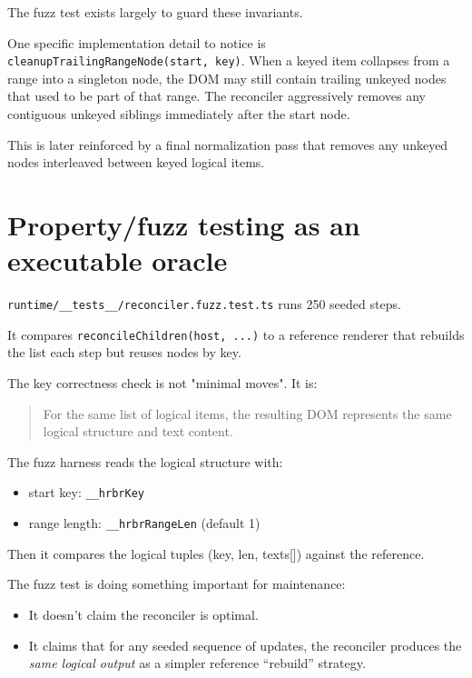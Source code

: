 The fuzz test exists largely to guard these invariants.

One specific implementation detail to notice is \texttt{cleanupTrailingRangeNode(start, key)}.
When a keyed item collapses from a range into a singleton node, the DOM may still contain trailing unkeyed nodes that used to be part of that range.
The reconciler aggressively removes any contiguous unkeyed siblings immediately after the start node.

This is later reinforced by a final normalization pass that removes any unkeyed nodes interleaved between keyed logical items.

\section{Property/fuzz testing as an executable oracle}

\texttt{runtime/\_\_tests\_\_/reconciler.fuzz.test.ts} runs 250 seeded steps.

It compares \texttt{reconcileChildren(host, ...)} to a reference renderer that rebuilds the list each step but reuses nodes by key.

The key correctness check is not "minimal moves". It is:

\begin{quote}
For the same list of logical items, the resulting DOM represents the same logical structure and text content.
\end{quote}

The fuzz harness reads the logical structure with:

\begin{itemize}
  \item start key: \texttt{\_\_hrbrKey}
  \item range length: \texttt{\_\_hrbrRangeLen} (default 1)
\end{itemize}

Then it compares the logical tuples (key, len, texts[]) against the reference.

The fuzz test is doing something important for maintenance:

\begin{itemize}
  \item It doesn’t claim the reconciler is optimal.
  \item It claims that for any seeded sequence of updates, the reconciler produces the \emph{same logical output} as a simpler reference “rebuild” strategy.
\end{itemize}


